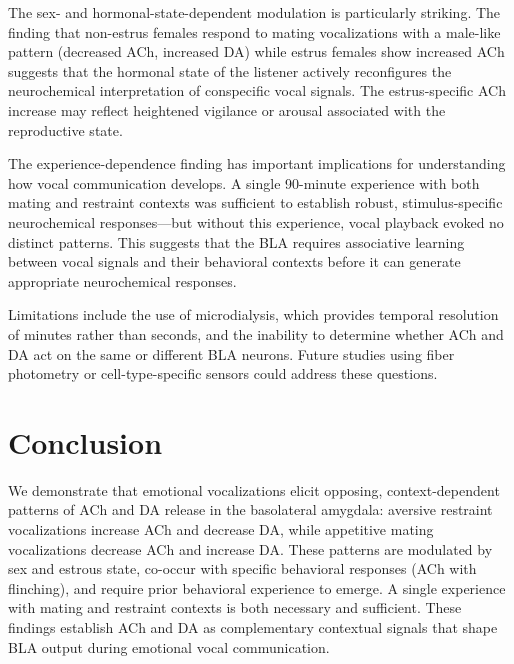\documentclass[11pt]{article}
\begin{document}
The sex- and hormonal-state-dependent modulation is particularly striking. The finding that non-estrus females respond to mating vocalizations with a male-like pattern (decreased ACh, increased DA) while estrus females show increased ACh suggests that the hormonal state of the listener actively reconfigures the neurochemical interpretation of conspecific vocal signals. The estrus-specific ACh increase may reflect heightened vigilance or arousal associated with the reproductive state.

The experience-dependence finding has important implications for understanding how vocal communication develops. A single 90-minute experience with both mating and restraint contexts was sufficient to establish robust, stimulus-specific neurochemical responses---but without this experience, vocal playback evoked no distinct patterns. This suggests that the BLA requires associative learning between vocal signals and their behavioral contexts before it can generate appropriate neurochemical responses.

Limitations include the use of microdialysis, which provides temporal resolution of minutes rather than seconds, and the inability to determine whether ACh and DA act on the same or different BLA neurons. Future studies using fiber photometry or cell-type-specific sensors could address these questions.

\section{Conclusion}

We demonstrate that emotional vocalizations elicit opposing, context-dependent patterns of ACh and DA release in the basolateral amygdala: aversive restraint vocalizations increase ACh and decrease DA, while appetitive mating vocalizations decrease ACh and increase DA. These patterns are modulated by sex and estrous state, co-occur with specific behavioral responses (ACh with flinching), and require prior behavioral experience to emerge. A single experience with mating and restraint contexts is both necessary and sufficient. These findings establish ACh and DA as complementary contextual signals that shape BLA output during emotional vocal communication.



\end{document}
